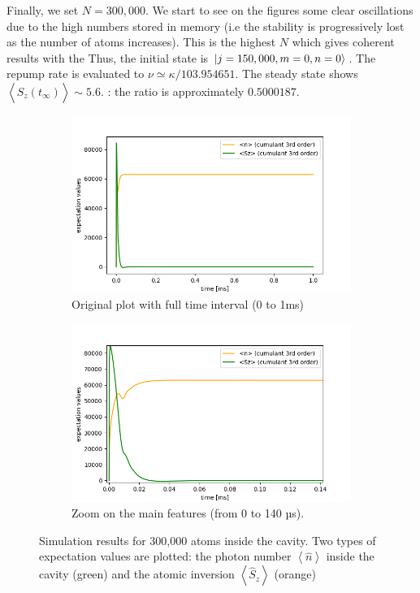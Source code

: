 \documentclass[11pt]{report}
\DeclarePairedDelimiter\ket{\lvert}{\rangle}
\begin{document}
Finally, we set $N=300,000$. We start to see on the figures some clear oscillations due to the high numbers stored in memory (i.e the stability is progressively lost as the number of atoms increases). This is the highest $N$ which gives coherent results with the  Thus, the initial state is $\ket{j=150,000, m=0, n=0}$. The repump rate is evaluated to $\nu \simeq \kappa / 103.954651$. The steady state shows $\left\langle \hat{S}_z(t_\infty) \right\rangle \sim 5.6$. : the ratio is approximately $0.5000187$.

\begin{figure}[h!]
\centering
\begin{subfigure}{.48\textwidth}
  \centering
  \includegraphics[width=1\linewidth]{300k_3_nsz}
  \caption{Original plot with full time interval (0 to 1ms)}
\end{subfigure}%
\hspace{1em}%
\begin{subfigure}{.48\textwidth}
  \centering
  \includegraphics[width=1\linewidth]{300k_3_nsz_zoom_1}
  \caption{Zoom on the main features (from 0 to 140 µs).}
  \label{300k_3_nsz_zoom_1}
\end{subfigure}
\caption{Simulation results for 300,000 atoms inside the cavity. Two types of expectation values are plotted: the photon number $\left\langle \hat{n} \right\rangle$ inside the cavity (green) and the atomic inversion $\left\langle  \hat{S}_z \right\rangle$ (orange)}
\end{figure}
\end{document}
